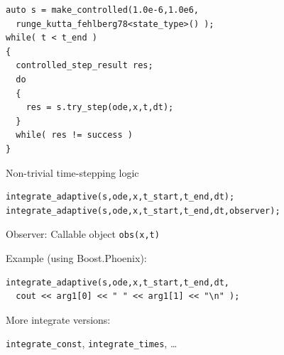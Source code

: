\begin{frame}[fragile]


\vspace{2ex}

\begin{lstlisting}
auto s = make_controlled(1.0e-6,1.0e6,
  runge_kutta_fehlberg78<state_type>() );
while( t < t_end )
{
  controlled_step_result res;
  do
  { 
    res = s.try_step(ode,x,t,dt);
  }
  while( res != success )
}
\end{lstlisting}

\centerline{Non-trivial time-stepping logic}

\end{frame}


\begin{frame}[fragile]


\vspace{2ex}


\begin{lstlisting}
integrate_adaptive(s,ode,x,t_start,t_end,dt); 
integrate_adaptive(s,ode,x,t_start,t_end,dt,observer);
\end{lstlisting}

Observer: Callable object {\tt obs(x,t)}

\vspace{4ex}
Example (using Boost.Phoenix):
\begin{lstlisting}
integrate_adaptive(s,ode,x,t_start,t_end,dt,
  cout << arg1[0] << " " << arg1[1] << "\n" );
\end{lstlisting}

\vspace{2ex}
More integrate versions:

{\tt integrate\_const}, {\tt integrate\_times}, \dots

\end{frame}



